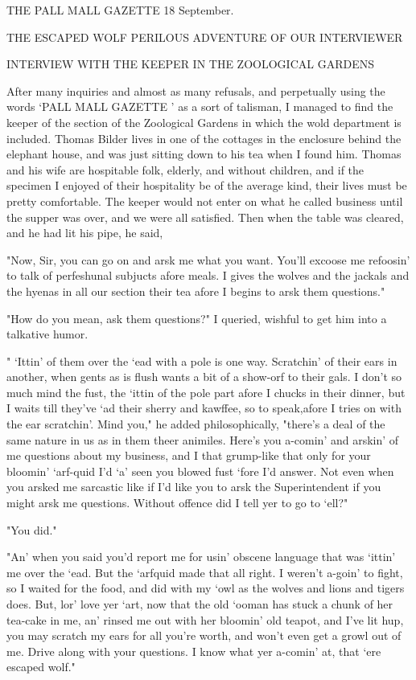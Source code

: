 THE PALL MALL GAZETTE 18 September. 

THE ESCAPED WOLF PERILOUS ADVENTURE OF OUR INTERVIEWER 

INTERVIEW WITH THE KEEPER IN THE ZOOLOGICAL GARDENS 

After many inquiries and almost as many refusals, and perpetually using the words `PALL MALL GAZETTE ' as a sort of talisman, I managed to find the keeper of the section of the Zoological Gardens in which the wold department is included. Thomas Bilder lives in one of the cottages in the enclosure behind the elephant house, and was just sitting down to his tea when I found him. Thomas and his wife are hospitable folk, elderly, and without children, and if the specimen I enjoyed of their hospitality be of the average kind, their lives must be pretty comfortable. The keeper would not enter on what he called business until the supper was over, and we were all satisfied. Then when the table was cleared, and he had lit his pipe, he said, 

"Now, Sir, you can go on and arsk me what you want. You'll excoose me refoosin' to talk of perfeshunal subjucts afore meals. I gives the wolves and the jackals and the hyenas in all our section their tea afore I begins to arsk them questions." 

"How do you mean, ask them questions?" I queried, wishful to get him into a talkative humor. 

" `Ittin' of them over the `ead with a pole is one way. Scratchin' of their ears in another, when gents as is flush wants a bit of a show-orf to their gals. I don't so much mind the fust, the `ittin of the pole part afore I chucks in their dinner, but I waits till they've `ad their sherry and kawffee, so to speak,afore I tries on with the ear scratchin'. Mind you," he added philosophically, "there's a deal of the same nature in us as in them theer animiles. Here's you a-comin' and arskin' of me questions about my business, and I that grump-like that only for your bloomin' `arf-quid I'd `a' seen you blowed fust `fore I'd answer. Not even when you arsked me sarcastic like if I'd like you to arsk the Superintendent if you might arsk me questions. Without offence did I tell yer to go to `ell?" 

"You did." 

"An' when you said you'd report me for usin' obscene language that was `ittin' me over the `ead. But the `arfquid made that all right. I weren't a-goin' to fight, so I waited for the food, and did with my `owl as the wolves and lions and tigers does. But, lor' love yer `art, now that the old `ooman has stuck a chunk of her tea-cake in me, an' rinsed me out with her bloomin' old teapot, and I've lit hup, you may scratch my ears for all you're worth, and won't even get a growl out of me. Drive along with your questions. I know what yer a-comin' at, that `ere escaped wolf." 

